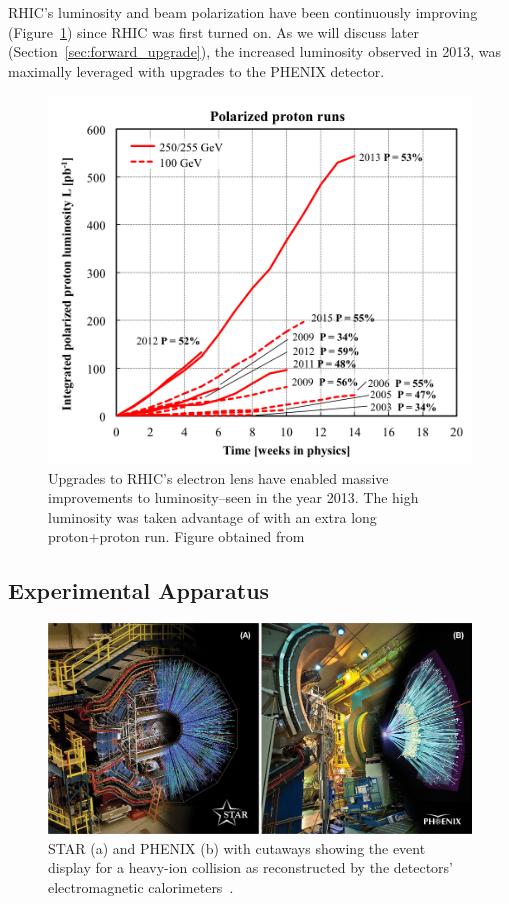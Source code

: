 RHIC's luminosity and beam polarization have been continuously improving
(Figure~\ref{fig:rhic_luminosity}) since RHIC was first turned on. As we will
discuss later (Section~\ref{sec:forward_upgrade}), the increased luminosity
observed in 2013, was maximally leveraged with upgrades to the PHENIX detector.

\begin{figure}[ht]
  \centering
  \includegraphics[width=0.8\linewidth]{./figures/RhicLuminosityPP.png}
  \caption{
    Upgrades to RHIC's electron lens have enabled massive improvements to
    luminosity--seen in the year 2013. The high luminosity was taken advantage
    of with an extra long proton+proton run. Figure obtained from
     \cite{Fischer2016}
  }
  \label{fig:rhic_luminosity}
\end{figure}


\clearpage
\subsection{Experimental Apparatus}

\begin{figure}[ht]
  \centering
  \includegraphics[width=\linewidth]{./figures/rhic_graphics_fig2-hr.jpg}
  \caption{
    STAR (a) and PHENIX (b) with cutaways showing the event display for a
    heavy-ion collision as reconstructed by the detectors' electromagnetic
    calorimeters~\cite{Walsh2012}.
  }
  \label{fig:phenix_and_star}
\end{figure}

